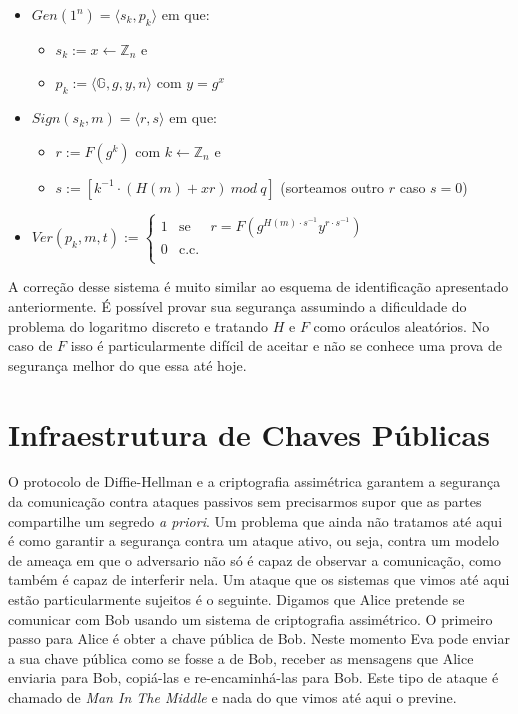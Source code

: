 \begin{itemize}
\item $Gen(1^n) = \langle s_k, p_k \rangle$ em que:
\begin{itemize}
\item $s_k := x \leftarrow \mathbb{Z}_n$ e
\item $p_k := \langle \mathbb{G}, g, y, n \rangle$ com $y = g^x$
\end{itemize}
\item $Sign(s_k, m) = \langle r, s \rangle$ em que:
  \begin{itemize}
  \item $r := F(g^k)$ com $k \leftarrow \mathbb{Z}_n$ e
  \item $s := [k^{-1} \cdot (H(m) + xr)\ mod\ q]$ (sorteamos outro $r$ caso $s = 0$)
  \end{itemize}
\item $Ver(p_k, m, t) := \left\{
    \begin{array}{lcl}
      1 & \textrm{se} & r = F(g^{H(m) \cdot s^{-1}} y^{r \cdot s^{-1}})\\
      0 & \textrm{c.c.} &\\
    \end{array}
    \right.$
\end{itemize}

A correção desse sistema é muito similar ao esquema de identificação apresentado anteriormente.
É possível provar sua segurança assumindo a dificuldade do problema do logaritmo discreto e tratando $H$ e $F$ como oráculos aleatórios.
No caso de $F$ isso é particularmente difícil de aceitar e não se conhece uma prova de segurança melhor do que essa até hoje.

\section{Infraestrutura de Chaves Públicas}
\label{sec:pki}

O protocolo de Diffie-Hellman e a criptografia assimétrica garantem a segurança da comunicação contra ataques passivos sem precisarmos supor que as partes compartilhe um segredo {\em a priori}.
Um problema que ainda não tratamos até aqui é como garantir a segurança contra um ataque ativo, ou seja, contra um modelo de ameaça em que o adversario não só é capaz de observar a comunicação, como também é capaz de interferir nela.
Um ataque que os sistemas que vimos até aqui estão particularmente sujeitos é o seguinte.
Digamos que Alice pretende se comunicar com Bob usando um sistema de criptografia assimétrico.
O primeiro passo para Alice é obter a chave pública de Bob.
Neste momento Eva pode enviar a sua chave pública como se fosse a de Bob, receber as mensagens que Alice enviaria para Bob, copiá-las e re-encaminhá-las para Bob.
Este tipo de ataque é chamado de {\em Man In The Middle} e nada do que vimos até aqui o previne.


